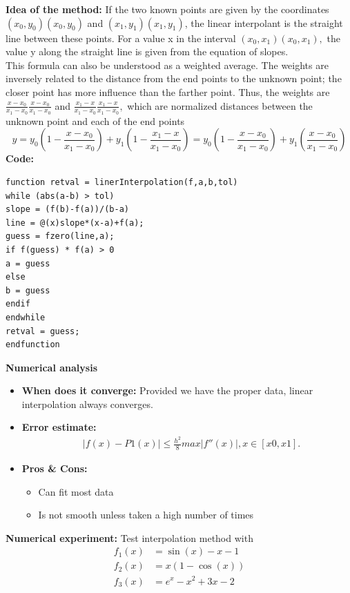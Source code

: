 \documentclass{article}
\begin{document}
	{\bf Idea of the method:} 
	If the two known points are given by the coordinates ${\displaystyle (x_{0},y_{0})} (x_{0},y_{0})$ and ${\displaystyle (x_{1},y_{1})} (x_{1},y_{1})$, the linear interpolant is the straight line between these points. For a value x in the interval ${\displaystyle (x_{0},x_{1})} (x_{0},x_{1}),$ the value y along the straight line is given from the equation of slopes.\\
	This formula can also be understood as a weighted average. The weights are inversely related to the distance from the end points to the unknown point; the closer point has more influence than the farther point. Thus, the weights are ${\textstyle {\frac {x-x_{0}}{x_{1}-x_{0}}}} {\textstyle {\frac  {x-x_{0}}{x_{1}-x_{0}}}}$ and ${\textstyle {\frac {x_{1}-x}{x_{1}-x_{0}}}} {\textstyle {\frac  {x_{1}-x}{x_{1}-x_{0}}}},$ which are normalized distances between the unknown point and each of the end points
	\[y = y _ { 0 } \left( 1 - \frac { x - x _ { 0 } } { x _ { 1 } - x _ { 0 } } \right) + y _ { 1 } \left( 1 - \frac { x _ { 1 } - x } { x _ { 1 } - x _ { 0 } } \right) = y _ { 0 } \left( 1 - \frac { x - x _ { 0 } } { x _ { 1 } - x _ { 0 } } \right) + y _ { 1 } \left( \frac { x - x _ { 0 } } { x _ { 1 } - x _ { 0 } } \right)\]
	{\bf Code:}
	\begin{verbatim}
function retval = linerInterpolation(f,a,b,tol)
while (abs(a-b) > tol)
slope = (f(b)-f(a))/(b-a)
line = @(x)slope*(x-a)+f(a);
guess = fzero(line,a);
if f(guess) * f(a) > 0
a = guess
else
b = guess
endif
endwhile
retval = guess;
endfunction
	\end{verbatim}
	{\bf Numerical analysis}
	\begin{itemize}
		\item{\bf When does it converge:} Provided we have the proper data, linear interpolation always converges.
		\item {\bf Error estimate:}
		\begin{equation}
		\begin{split}
		& |f (x) − P1(x)| \leq \frac{h^2}{8}
		max|f''(x)|, x \in [x0, x1].
		\end{split}
		\end{equation}
		\item {\bf Pros \& Cons:}
		\begin{itemize}
			\item Can fit most data
			\item Is not smooth unless taken a high number of times
		\end{itemize}
	\end{itemize}
	{\bf Numerical experiment:}
	Test interpolation method with 
	\begin{align*} f _ { 1 } ( x ) & = \sin ( x ) - x - 1 \\ f _ { 2 } ( x ) & = x ( 1 - \cos ( x ) ) \\ f _ { 3 } ( x ) & = e ^ { x } - x ^ { 2 } + 3 x - 2 \end{align*}
	
\end{document}
